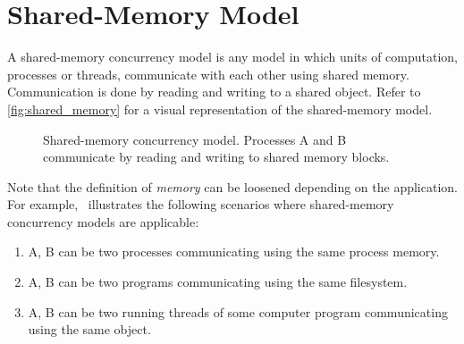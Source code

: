 \section{Shared-Memory Model\label{sec:shared_memory}}
A shared-memory concurrency model is any model in which units of computation,
processes or threads, communicate with each other using shared memory.
Communication is done by reading and writing to a shared object. Refer to
\autoref{fig:shared_memory} for a visual representation of the shared-memory model.

\begin{figure}[!htp]
    \centering
      \caption{
        Shared-memory concurrency model. 
        Processes A and B communicate by reading and writing to shared memory blocks.
      }
      \label{fig:shared_memory}
\end{figure}

Note that the definition of \textit{memory} can be loosened depending on the application.
For example,~\cite{mitConcurrency} illustrates the following scenarios
where shared-memory concurrency models are applicable:

\begin{enumerate}
    \item A, B can be two processes communicating using the same process memory.
    \item A, B can be two programs communicating using the same filesystem.
    \item \label{itm:shared_object} A, B can be two running threads of some computer program
        communicating using the same object.
\end{enumerate}

